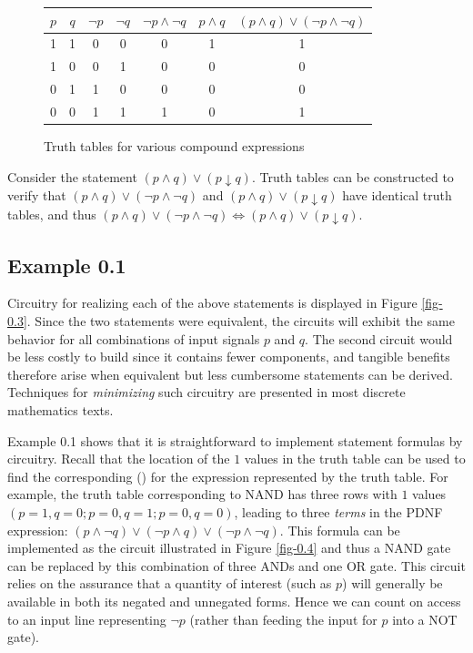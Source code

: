 \begin{figure}[tb]
\begin{center}
\begin{tabular}{cc|ccccc}
$p$ & $q$ & $\neg p$ & $\neg q$ & $\neg p\wedge\neg q$ & $p\wedge q$ &
	$(p\wedge q)\vee(\neg p\wedge\neg q)$\\
\hline
1 & 1 & 0 & 0 & 0 & 1 & 1\\
1 & 0 & 0 & 1 & 0 & 0 & 0\\
0 & 1 & 1 & 0 & 0 & 0 & 0\\
0 & 0 & 1 & 1 & 1 & 0 & 1
\end{tabular}
\end{center}
\caption{Truth tables for various compound expressions}\label{fig-0.2}
\end{figure}

Consider the statement $(p \wedge q) \vee (p \downarrow q)$.
Truth tables can be constructed to
verify that $(p \wedge q)  \vee (\neg p \wedge \neg q)$ and 
$(p \wedge q) \vee (p \downarrow q)$ have identical truth tables, and
thus $(p \wedge q) \vee (\neg p \wedge \neg q) \Leftrightarrow (p \wedge q)
\vee (p \downarrow q)$.

\subsection*{Example 0.1}

Circuitry for realizing each of the above statements is displayed in Figure
\ref{fig-0.3}. Since the two statements were equivalent, the circuits will
exhibit the same behavior for all combinations of input signals $p$ and $q$.
The second circuit would be less costly to build since it contains fewer
components, and tangible benefits therefore arise when equivalent but less
cumbersome statements can be derived. Techniques for \emph{minimizing} such circuitry
are presented in most discrete mathematics texts.

Example 0.1 shows that it is straightforward to implement statement formulas
by circuitry. Recall that the location of the $1$ values in the truth table can
be used to find the corresponding \emph{} () for the expression represented by the truth table. For
example, the truth table corresponding to NAND has three rows with $1$ values
$(p = 1, q = 0; p = 0, q = 1; p = 0, q = 0)$, leading to three \emph{terms} in the PDNF
expression: $(p \wedge \neg q) \vee (\neg p \wedge q) \vee  (\neg p \wedge \neg
q)$. This formula can be implemented as the circuit illustrated in Figure
\ref{fig-0.4} and thus a NAND gate can be replaced by this combination of three
ANDs and one OR gate. This circuit relies on the assurance that a quantity of
interest (such as $p$) will generally be available in both its negated and
unnegated forms. Hence we can count on access to an input line representing
$\neg p$ (rather than feeding the input for $p$ into a NOT gate).

